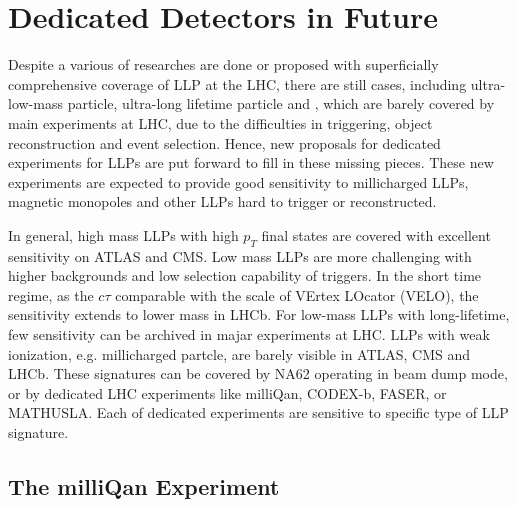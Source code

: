 \section{Dedicated Detectors in Future}

Despite a various of researches are done or proposed with superficially comprehensive coverage of LLP at the LHC, there are still cases, including ultra-low-mass particle, ultra-long lifetime particle and , which are barely covered by main experiments at LHC, due to the difficulties in triggering, object reconstruction and event selection. Hence, new proposals for dedicated experiments for LLPs are put forward to fill in these missing pieces. These new experiments are expected to provide good sensitivity to millicharged LLPs, magnetic monopoles and other LLPs hard to trigger or reconstructed.

In general, high mass LLPs with high $p_T$ final states are covered with excellent sensitivity on ATLAS and CMS. Low mass LLPs are more challenging with higher backgrounds and low selection capability of triggers. In the short time regime, as the $c\tau$ comparable with the scale of VErtex LOcator (VELO), the sensitivity extends to lower mass in LHCb. For low-mass LLPs with long-lifetime, few sensitivity can be archived in majar experiments at LHC. LLPs with weak ionization, e.g. millicharged partcle, are barely visible in ATLAS, CMS and LHCb. These signatures can be covered by NA62 operating in beam dump mode, or by dedicated LHC experiments like milliQan, CODEX-b, FASER, or MATHUSLA. Each of dedicated experiments are sensitive to specific type of LLP signature.

\subsection{The milliQan Experiment}

